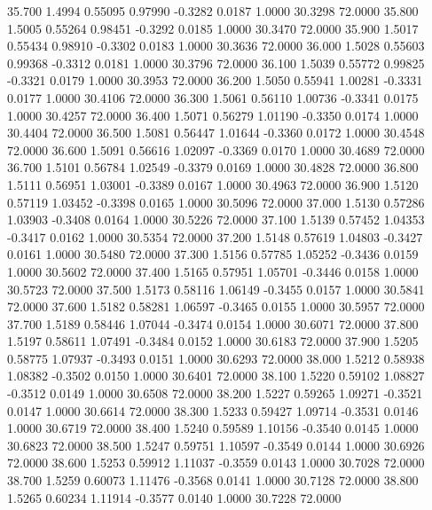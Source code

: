  35.700   1.4994   0.55095   0.97990  -0.3282   0.0187   1.0000  30.3298  72.0000
  35.800   1.5005   0.55264   0.98451  -0.3292   0.0185   1.0000  30.3470  72.0000
  35.900   1.5017   0.55434   0.98910  -0.3302   0.0183   1.0000  30.3636  72.0000
  36.000   1.5028   0.55603   0.99368  -0.3312   0.0181   1.0000  30.3796  72.0000
  36.100   1.5039   0.55772   0.99825  -0.3321   0.0179   1.0000  30.3953  72.0000
  36.200   1.5050   0.55941   1.00281  -0.3331   0.0177   1.0000  30.4106  72.0000
  36.300   1.5061   0.56110   1.00736  -0.3341   0.0175   1.0000  30.4257  72.0000
  36.400   1.5071   0.56279   1.01190  -0.3350   0.0174   1.0000  30.4404  72.0000
  36.500   1.5081   0.56447   1.01644  -0.3360   0.0172   1.0000  30.4548  72.0000
  36.600   1.5091   0.56616   1.02097  -0.3369   0.0170   1.0000  30.4689  72.0000
  36.700   1.5101   0.56784   1.02549  -0.3379   0.0169   1.0000  30.4828  72.0000
  36.800   1.5111   0.56951   1.03001  -0.3389   0.0167   1.0000  30.4963  72.0000
  36.900   1.5120   0.57119   1.03452  -0.3398   0.0165   1.0000  30.5096  72.0000
  37.000   1.5130   0.57286   1.03903  -0.3408   0.0164   1.0000  30.5226  72.0000
  37.100   1.5139   0.57452   1.04353  -0.3417   0.0162   1.0000  30.5354  72.0000
  37.200   1.5148   0.57619   1.04803  -0.3427   0.0161   1.0000  30.5480  72.0000
  37.300   1.5156   0.57785   1.05252  -0.3436   0.0159   1.0000  30.5602  72.0000
  37.400   1.5165   0.57951   1.05701  -0.3446   0.0158   1.0000  30.5723  72.0000
  37.500   1.5173   0.58116   1.06149  -0.3455   0.0157   1.0000  30.5841  72.0000
  37.600   1.5182   0.58281   1.06597  -0.3465   0.0155   1.0000  30.5957  72.0000
  37.700   1.5189   0.58446   1.07044  -0.3474   0.0154   1.0000  30.6071  72.0000
  37.800   1.5197   0.58611   1.07491  -0.3484   0.0152   1.0000  30.6183  72.0000
  37.900   1.5205   0.58775   1.07937  -0.3493   0.0151   1.0000  30.6293  72.0000
  38.000   1.5212   0.58938   1.08382  -0.3502   0.0150   1.0000  30.6401  72.0000
  38.100   1.5220   0.59102   1.08827  -0.3512   0.0149   1.0000  30.6508  72.0000
  38.200   1.5227   0.59265   1.09271  -0.3521   0.0147   1.0000  30.6614  72.0000
  38.300   1.5233   0.59427   1.09714  -0.3531   0.0146   1.0000  30.6719  72.0000
  38.400   1.5240   0.59589   1.10156  -0.3540   0.0145   1.0000  30.6823  72.0000
  38.500   1.5247   0.59751   1.10597  -0.3549   0.0144   1.0000  30.6926  72.0000
  38.600   1.5253   0.59912   1.11037  -0.3559   0.0143   1.0000  30.7028  72.0000
  38.700   1.5259   0.60073   1.11476  -0.3568   0.0141   1.0000  30.7128  72.0000
  38.800   1.5265   0.60234   1.11914  -0.3577   0.0140   1.0000  30.7228  72.0000
